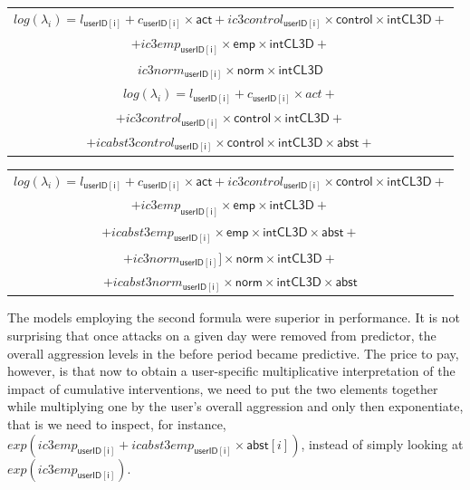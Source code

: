 \documentclass[preprint,12pt]{elsarticle}
\begin{document}
\footnotesize


\begin{center}
\begin{tabular}{c}
$log(\lambda_i)  =  l_{\mathsf{userID[i]}}  + c_{\mathsf{userID[i]}} \times \mathsf{act} + 
      ic3control_{\mathsf{userID[i]}} \times  \mathsf{control} \times \mathsf{intCL3D}  + $\\$  + 
            ic3emp_{\mathsf{userID[i]}} \times  \mathsf{emp} \times \mathsf{intCL3D}  + $\\  
    $  ic3norm_{\mathsf{userID[i]}} \times  \mathsf{norm} \times \mathsf{intCL3D}$\\
$log(\lambda_i)  =  l_{\mathsf{userID[i]}}  + c_{\mathsf{userID[i]}} \times  act + $\\$  + 
      ic3control_{\mathsf{userID[i]}} \times   \mathsf{control} \times  \mathsf{intCL3D}  + $\\$  + icabst3control_{\mathsf{userID[i]}} \times   \mathsf{control} \times  \mathsf{intCL3D} \times  \mathsf{abst} + $\\ 
        \end{tabular}
\end{center}

\begin{center}
\begin{tabular}{c}
  $log(\lambda_i)  =  l_{\mathsf{userID[i]}}  + c_{\mathsf{userID[i]}} \times \mathsf{act} + 
      ic3control_{\mathsf{userID[i]}} \times  \mathsf{control} \times \mathsf{intCL3D}  + $\\ $ +    ic3emp_{\mathsf{userID[i]}} \times   \mathsf{emp} \times  \mathsf{intCL3D}  + $\\$  + icabst3emp_{\mathsf{userID[i]}} \times   \mathsf{emp} \times  \mathsf{intCL3D}  \times  \mathsf{abst} + $\\ $ +
        ic3norm_{\mathsf{userID[i]}}] \times   \mathsf{norm} \times  \mathsf{intCL3D} + $\\ $ + icabst3norm_{\mathsf{userID[i]}} \times   \mathsf{norm} \times  \mathsf{intCL3D} \times  \mathsf{abst} 
        $
        \end{tabular}
\end{center}


\normalsize

The models employing the second formula were superior in performance. It
is not surprising that once attacks on a given day were removed from
predictor, the overall aggression levels in the before period became
predictive. The price to pay, however, is that now to obtain a
user-specific multiplicative interpretation of the impact of cumulative
interventions, we need to put the two elements together while
multiplying one by the user's overall aggression and only then
exponentiate, that is we need to inspect, for instance,
\(exp(ic3emp_{\mathsf{userID[i]}} + icabst3emp_{\mathsf{userID[i]}} \times \mathsf{abst}[i])\),
instead of simply looking at \(exp(ic3emp_{\mathsf{userID[i]}})\).
\end{document}
